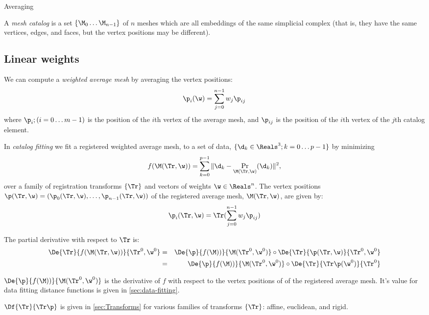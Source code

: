 \begin{plSection}{Averaging}
\label{sec:Averaging}

A {\it mesh catalog} is a set $\{ \M_0 \ldots \M_{n-1} \}$
of $n$ meshes which are all embeddings
of the same simplicial complex
(that is, they have the same vertices, edges, and faces,
but the vertex positions may be different).

\subsection{Linear weights}
\label{sec:Linear-weights}

We can compute a {\it weighted average mesh} by averaging the vertex positions:
\begin{equation}
\p_i(\w) = \sum_{j=0}^{n-1} w_j \p_{ij}
\end{equation}
where $\p_{i}; (i=0 \ldots m-1)$ is the position of the $i$th vertex of the average mesh,
and $\p_{ij}$ is the position of the $i$th vertex of the $j$th catalog element.

In {\it catalog fitting} we fit a registered weighted average mesh,
to a set of data, $\{ \d_k \in \Reals^3; k=0 \ldots p-1 \}$
by minimizing
\begin{equation}
f(\M(\Tr,\w)) = \sum_{k=0}^{p-1} \| \d_k - \Pr_{\M(\Tr,\w)} (\d_k) \|^2 ,
\end{equation}
over a family of registration transforms $\{\Tr\}$
and vectors of weights $\w \in \Reals^n$.
The vertex positions $\p(\Tr,\w) = (\p_0(\Tr,\w), \ldots , \p_{n-1}(\Tr,\w))$
of the registered average mesh, $\M(\Tr,\w)$, are given by:
\begin{equation}
\p_i(\Tr,\w) = \Tr ( \sum_{j=0}^{n-1} w_j \p_{ij} )
\end{equation}

The partial derivative with respect to $\Tr$
is:
\begin{eqnarray}
\De{\Tr}{f(\M(\Tr,\w))}{\Tr^0,\w^0}
& = &
\De{\p}{f(\M))}{\M(\Tr^0,\w^0)}
\circ
\De{\Tr}{\p(\Tr,\w)}{\Tr^0,\w^0}
\\
& = &
\De{\p}{f(\M))}{\M(\Tr^0,\w^0)}
\circ
\De{\Tr}{\Tr\p(\w^0)}{\Tr^0}
\nonumber
\end{eqnarray}

$\De{\p}{f(\M))}{\M(\Tr^0,\w^0)}$ is the derivative of $f$ with respect to
the vertex positions of of the registered average mesh.
It's value for data fitting distance functions
is given in \autoref{sec:data-fitting}.

$\Df{\Tr}{\Tr\p}$ is given in \autoref{sec:Transforms}
for various families of transforms $\{\Tr\}$: affine, euclidean, and rigid.


\end{plSection}
